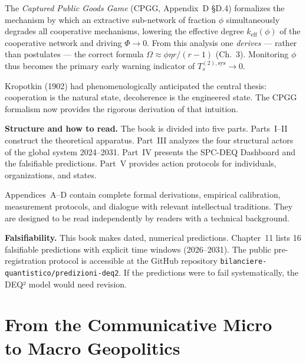 \documentclass[12pt, twoside]{book}
\theoremstyle{plain}
\theoremstyle{definition}
\theoremstyle{remark}
\begin{document}
The \textit{Captured Public Goods Game} (CPGG, Appendix~D §D.4) formalizes the mechanism by which an extractive sub-network of fraction $\phi$ simultaneously degrades all cooperative mechanisms, lowering the effective degree $k_\text{eff}(\phi)$ of the cooperative network and driving $\Phi \to 0$. From this analysis one \emph{derives} --- rather than postulates --- the correct formula $\Omega \approx \phi\eta r/(r-1)$ (Ch.~3). Monitoring $\phi$ thus becomes the primary early warning indicator of $T_s^{(2),\text{sys}} \to 0$.

Kropotkin (1902) had phenomenologically anticipated the central thesis: cooperation is the natural state, decoherence is the engineered state. The CPGG formalism now provides the rigorous derivation of that intuition.

\textbf{Structure and how to read.}
The book is divided into five parts. Parts~I--II construct the theoretical apparatus. Part~III analyzes the four structural actors of the global system 2024--2031. Part~IV presents the SPC-DEQ Dashboard and the falsifiable predictions. Part~V provides action protocols for individuals, organizations, and states.

Appendices~A--D contain complete formal derivations, empirical calibration, measurement protocols, and dialogue with relevant intellectual traditions. They are designed to be read independently by readers with a technical background.

\textbf{Falsifiability.}
This book makes dated, numerical predictions. Chapter~11 lists 16 falsifiable predictions with explicit time windows (2026--2031). The public pre-registration protocol is accessible at the GitHub repository \texttt{bilanciere-quantistico/predizioni-deq2}. If the predictions were to fail systematically, the DEQ² model would need revision.

\cleardoublepage
{}

\part[From the Communicative Micro to Macro Geopolitics]{From the Communicative Micro\\to Macro Geopolitics}




\end{document}
